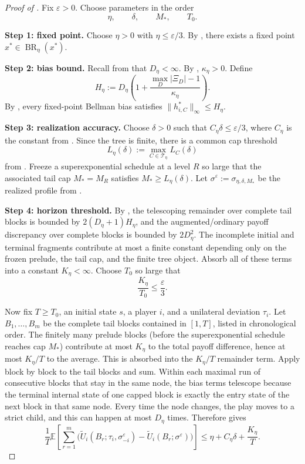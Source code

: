 \documentclass[12pt]{article}
\theoremstyle{definition}
\newcommand{\eps}{\varepsilon}
\newcommand{\E}{\mathbb{E}}
\newcommand{\1}{\mathbf{1}}
\newcommand{\cT}{\mathcal{T}}
\DeclareMathOperator{\BR}{BR}
\begin{document}
\begin{proof}[Proof of ]
Fix $\eps>0$. Choose parameters in the order
\[
\eta,\qquad \delta,\qquad M_*,\qquad T_0.
\]

\smallskip
\noindent\textbf{Step 1: fixed point.}
Choose $\eta>0$ with $\eta\le \eps/3$. By
, there exists a fixed point $x^*\in\BR_\eta(x^*)$.

\smallskip
\noindent\textbf{Step 2: bias bound.}
Recall from  that $D_\eta<\infty$. By
, $\kappa_\eta>0$. Define
\[
H_\eta:=D_\eta\left(1+\frac{\max_D|\Xi_D|-1}{\kappa_\eta}\right).
\]
By , every fixed-point Bellman bias satisfies
$\|h_{i,C}^*\|_\infty\le H_\eta$.

\smallskip
\noindent\textbf{Step 3: realization accuracy.}
Choose $\delta>0$ such that $C_\eta\delta\le \eps/3$, where $C_\eta$ is the
constant from . Since the tree is finite, there is a common
cap threshold
\[
L_\eta(\delta):=\max_{C\in\cT_\eta}L_C(\delta)
\]
from . Freeze a superexponential schedule at a level
$R$ so large that the associated tail cap $M_*=M_R$ satisfies
$M_*\ge L_\eta(\delta)$. Let
$\sigma^\eps:=\sigma_{\eta,\delta,M_*}$ be the realized profile from
.

\smallskip
\noindent\textbf{Step 4: horizon threshold.}
By , the telescoping remainder over complete tail blocks is
bounded by $2(D_\eta+1)H_\eta$, and the augmented/ordinary payoff discrepancy over
complete blocks is bounded by $2D_\eta^2$. The incomplete initial and terminal
fragments contribute at most a finite constant depending only on the frozen
prelude, the tail cap, and the finite tree object. Absorb all of these terms into
a constant $K_\eta<\infty$. Choose $T_0$ so large that
\[
\frac{K_\eta}{T_0}\le \frac{\eps}{3}.
\]

Now fix $T\ge T_0$, an initial state $s$, a player $i$, and a unilateral deviation
$\tau_i$. Let $B_1,\dots,B_m$ be the complete tail blocks contained in $[1,T]$,
listed in chronological order. The finitely many prelude blocks (before the
superexponential schedule reaches cap $M_*$) contribute at most $K_\eta$ to the
total payoff difference, hence at most $K_\eta/T$ to the average. This is
absorbed into the $K_\eta/T$ remainder term. Apply  block
by block to the
tail blocks and sum. Within each maximal run of consecutive blocks that stay in
the same node, the bias terms telescope because the terminal internal state of one
capped block is exactly the entry state of the next block in that same node. Every
time the node changes, the play moves to a strict child, and this can happen at
most $D_\eta$ times. Therefore  gives
\[
\frac1T\E\left[\sum_{r=1}^m
\bigl(
\widetilde U_i(B_r;\tau_i,\sigma^\eps_{-i})
-
\widetilde U_i(B_r;\sigma^\eps)
\bigr)\right]
\le
\eta + C_\eta\delta + \frac{K_\eta}{T}.
\]


\end{proof}
\end{document}
